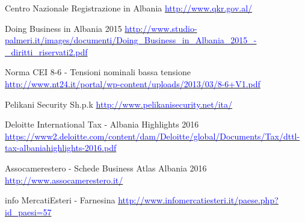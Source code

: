 \begin{thebibliography}{99}
	 Centro Nazionale Registrazione in Albania\newline 
			\href{http://www.qkr.gov.al/}{\textcolor{blue}{http://www.qkr.gov.al/}}

	 Doing Business in Albania 2015\newline 
			\href{http://www.studio-palmeri.it/images/documenti/Doing\_Business\_in\_Albania\_2015\_-\_diritti\_riservati2.pdf}{\textcolor{blue}{http://www.studio-palmeri.it/images/documenti/Doing\_Business\_in\_Albania\_2015\_-\_diritti\_riservati2.pdf}}

	 Norma CEI 8-6 - Tensioni nominali bassa tensione\newline 
			\href{http://www.nt24.it/portal/wp-content/uploads/2013/03/8-6+V1.pdf}{\textcolor{blue}{http://www.nt24.it/portal/wp-content/uploads/2013/03/8-6+V1.pdf}}
	
	 Pelikani Security Sh.p.k\newline 
			\href{http://www.pelikanisecurity.net/ita/}{\textcolor{blue}{http://www.pelikanisecurity.net/ita/}}

	 Deloitte International Tax - Albania Highlights 2016 \newline 
			\href{https://www2.deloitte.com/content/dam/Deloitte/global/Documents/Tax/dttl-tax-albaniahighlights-2016.pdf}{\textcolor{blue}{https://www2.deloitte.com/content/dam/Deloitte/global/Documents/Tax/dttl-tax-albaniahighlights-2016.pdf}}

	 Assocamerestero - Schede Business Atlas Albania 2016 \newline 
			\href{http://www.assocamerestero.it/}{\textcolor{blue}{http://www.assocamerestero.it/}}	

	 info MercatiEsteri - Farnesina \newline 
			\href{http://www.infomercatiesteri.it/paese.php?id\_paesi=57}{\textcolor{blue}{http://www.infomercatiesteri.it/paese.php?id\_paesi=57	}}
	

	
\end{thebibliography}